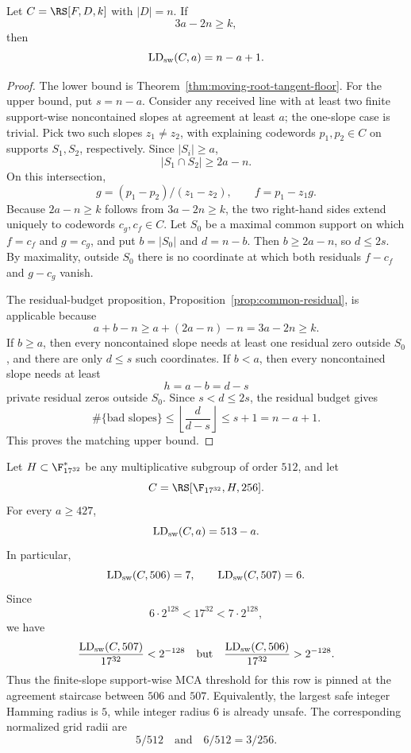 \begin{theorem}
\label{thm:very-high-tangent-staircase}
Let \(C=\RS[F,D,k]\) with \(|D|=n\).  If
\[
  3a-2n\ge k,
\]
then
\[
  \operatorname{LD}_{\rm sw}(C,a)=n-a+1 .
\]
\end{theorem}

\begin{proof}
The lower bound is Theorem~\ref{thm:moving-root-tangent-floor}.  For the upper
bound, put \(s=n-a\).  Consider any received line with at least two finite
support-wise noncontained slopes at agreement at least \(a\); the one-slope
case is trivial.  Pick two such slopes \(z_1\ne z_2\), with explaining
codewords \(p_1,p_2\in C\) on supports \(S_1,S_2\), respectively.  Since
\(|S_i|\ge a\),
\[
  |S_1\cap S_2|\ge 2a-n.
\]
On this intersection,
\[
  g=(p_1-p_2)/(z_1-z_2),
  \qquad
  f=p_1-z_1 g .
\]
Because \(2a-n\ge k\) follows from \(3a-2n\ge k\), the two right-hand sides
extend uniquely to codewords \(c_g,c_f\in C\).  Let \(S_0\) be a maximal common
support on which \(f=c_f\) and \(g=c_g\), and put \(b=|S_0|\) and
\(d=n-b\).  Then \(b\ge 2a-n\), so \(d\le 2s\).  By maximality, outside
\(S_0\) there is no coordinate at which both residuals \(f-c_f\) and
\(g-c_g\) vanish.

The residual-budget proposition, Proposition~\ref{prop:common-residual}, is
applicable because
\[
  a+b-n\ge a+(2a-n)-n=3a-2n\ge k .
\]
If \(b\ge a\), then every noncontained slope needs at least one residual zero
outside \(S_0\), and there are only \(d\le s\) such coordinates.  If \(b<a\),
then every noncontained slope needs at least
\[
  h=a-b=d-s
\]
private residual zeros outside \(S_0\).  Since \(s<d\le2s\), the residual
budget gives
\[
  \#\{\text{bad slopes}\}
  \le
  \left\lfloor \frac d{d-s}\right\rfloor
  \le s+1
  =n-a+1 .
\]
This proves the matching upper bound.
\end{proof}

\begin{corollary}
\label{cor:f17-32-exact-tangent-gate}
Let \(H\subset \F_{17^{32}}^*\) be any multiplicative subgroup of order
\(512\), and let
\[
  C=\RS[\F_{17^{32}},H,256].
\]
For every \(a\ge427\),
\[
  \operatorname{LD}_{\rm sw}(C,a)=513-a.
\]
In particular,
\[
  \operatorname{LD}_{\rm sw}(C,506)=7,
  \qquad
  \operatorname{LD}_{\rm sw}(C,507)=6.
\]
Since
\[
  6\cdot2^{128}<17^{32}<7\cdot2^{128},
\]
we have
\[
  \frac{\operatorname{LD}_{\rm sw}(C,507)}{17^{32}}<2^{-128}
  \quad\text{but}\quad
  \frac{\operatorname{LD}_{\rm sw}(C,506)}{17^{32}}>2^{-128}.
\]
Thus the finite-slope support-wise MCA threshold for this row is pinned at the
agreement staircase between \(506\) and \(507\).  Equivalently, the largest safe
integer Hamming radius is \(5\), while integer radius \(6\) is already unsafe.
The corresponding normalized grid radii are
\[
  5/512
  \quad\text{and}\quad
  6/512=3/256.
\]
\end{corollary}

